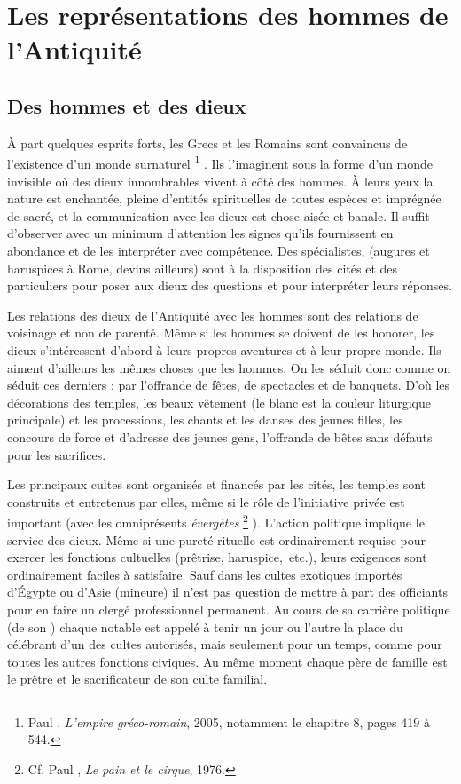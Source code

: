 

\chapter{Les représentations des hommes de l'Antiquité}

\section{Des hommes et des dieux}

À part quelques esprits forts, les Grecs et les Romains sont convaincus de l'existence d'un monde surnaturel%
\footnote{Paul , \emph{L'empire gréco-romain}, 2005, notamment le chapitre 8, pages 419 à 544.}%
. Ils l'imaginent sous la forme d'un monde invisible où des dieux innombrables vivent à côté des hommes. À leurs yeux la nature est enchantée, pleine d'entités spirituelles de toutes espèces et imprégnée de sacré, et la communication avec les dieux est chose aisée et banale. Il suffit d'observer avec un minimum d'attention les signes qu'ils fournissent en abondance et de les interpréter avec compétence. Des spécialistes, (augures et haruspices à Rome, devins ailleurs) sont à la disposition des cités et des particuliers pour poser aux dieux des questions et pour interpréter leurs réponses.

 Les relations des dieux de l'Antiquité avec les hommes sont des relations de voisinage et non de parenté. Même si les hommes se doivent de les honorer, les dieux s'intéressent d'abord à leurs propres aventures et à leur propre monde. Ils aiment d'ailleurs les mêmes choses que les hommes. On les séduit donc comme on séduit ces derniers : par l'offrande de fêtes, de spectacles et de banquets. D'où les décorations des temples, les beaux vêtement (le blanc est la couleur liturgique principale) et les processions, les chants et les danses des jeunes filles, les concours de force et d'adresse des jeunes gens, l'offrande de bêtes sans défauts pour les sacrifices. 

 Les principaux cultes sont organisés et financés par les cités, les temples sont construits et entretenus par elles, même si le rôle de l'initiative privée est important (avec les omniprésents \emph{évergètes}%
\footnote{Cf. Paul , \emph{Le pain et le cirque}, 1976.}%
 ). L'action politique implique le service des dieux. Même si une pureté rituelle est ordinairement requise pour exercer les fonctions cultuelles (prêtrise, haruspice,~etc.), leurs exigences sont ordinairement faciles à satisfaire. Sauf dans les cultes exotiques importés d'Égypte ou d'Asie (mineure) il n'est pas question de mettre à part des officiants pour en faire un clergé professionnel permanent. Au cours de sa carrière politique (de son ) chaque notable est appelé à tenir un jour ou l'autre la place du célébrant d'un des cultes autorisés, mais seulement pour un temps, comme pour toutes les autres fonctions civiques. Au même moment chaque père de famille est le prêtre et le sacrificateur de son culte familial. 

